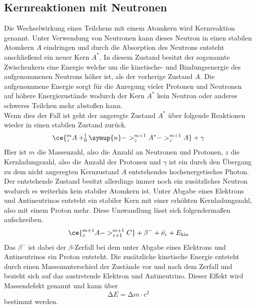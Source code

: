 \subsection{Kernreaktionen mit Neutronen}
Die Wechselwirkung eines Teilchens mit einem Atomkern wird Kernreaktion genannt. 
Unter Verwendung von Neutronen kann dieses Neutron in einen stabilen Atomkern $A$ eindringen und durch die Absorption des Neutrons
entsteht anschließend ein neuer Kern $A^{*}$. In diesem Zustand besitzt der sogenannte Zwischenkern eine Energie welche um die kinetische- und Bindungsenergie
des aufgenommenen Neutrons höher ist, als der vorherige Zustand $A$. Die aufgenommene Energie sorgt für die Anregung vieler Protonen und Neutronen auf höhere Energiezustände
wodurch der Kern $A^{*}$ kein Neutron oder anderes schweres Teilchen mehr abstoßen kann. 
\\
Wenn dies der Fall ist geht der angeregte Zustand $A^{*}$ über folgende Reaktionen wieder in einen stabilen Zustand zurück.
\begin{equation}
    \ce{^{m}_{z}A + ^{1}_{0}\symup{n} -> ^{m+1}_{z}A^{*} -> ^{m+1}_{z}A} + \gamma
\end{equation}
Hier ist $m$ die Massenzahl, also die Anzahl an Neutronen und Protonen, $z$ die Kernladungszahl, also die Anzahl der Protonen und $\gamma$ ist ein durch den Übergang zu dem nicht angeregten Kernzustand $A$
entstehendes hochenergetisches Photon.
\\
Der entstehende Zustand besitzt allerdings immer noch ein zusätzliches Neutron wodurch es weiterhin kein stabiler Atomkern ist. Unter Abgabe eines Elektrons und Antineutrinos entsteht ein stabiler Kern
mit einer erhöhten Kernladungszahl, also mit einem Proton mehr. Diese Umwandlung lässt sich folgendermaßen aufschreiben.
\begin{equation}
\label{eqn:zerfalleinfach}
\ce{^{m+1}_{z}A -> ^{m+1}_{z+1}C} +\beta^{-} + \bar{\nu_{e}} + E_{\text{kin}}
\end{equation}
Das ${\beta}^{-}$ ist dabei der $\beta$-Zerfall bei dem unter Abgabe eines Elektrons und Antineutrinos ein Proton entsteht.
Die zusätzliche kinetische Energie entsteht durch einen Massenunterschied der Zustände vor und nach dem Zerfall und bezieht sich auf das austretende Elektron und Antineutrino. Dieser Effekt wird
Massendefekt genannt und kann über 
\begin{equation}
\label{eqn:einsteineq}
\increment E = \increment m \cdot c^2
\end{equation}
bestimmt werden. 
\\
